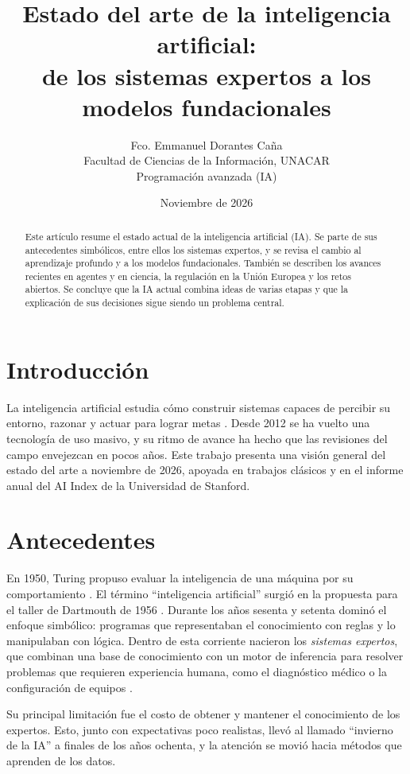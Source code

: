 \documentclass[11pt,a4paper]{article}
\title{Estado del arte de la inteligencia artificial:\\ de los sistemas expertos a los modelos fundacionales}
\author{Fco. Emmanuel Dorantes Caña\\
Facultad de Ciencias de la Información, UNACAR\\
Programación avanzada (IA)}
\date{Noviembre de 2026}
\begin{document}
\maketitle

\begin{abstract}
Este artículo resume el estado actual de la inteligencia artificial (IA). Se parte de sus antecedentes simbólicos, entre ellos los sistemas expertos, y se revisa el cambio al aprendizaje profundo y a los modelos fundacionales. También se describen los avances recientes en agentes y en ciencia, la regulación en la Unión Europea y los retos abiertos. Se concluye que la IA actual combina ideas de varias etapas y que la explicación de sus decisiones sigue siendo un problema central.
\end{abstract}

\section{Introducción}
La inteligencia artificial estudia cómo construir sistemas capaces de percibir su entorno, razonar y actuar para lograr metas \cite{russell2020}. Desde 2012 se ha vuelto una tecnología de uso masivo, y su ritmo de avance ha hecho que las revisiones del campo envejezcan en pocos años. Este trabajo presenta una visión general del estado del arte a noviembre de 2026, apoyada en trabajos clásicos y en el informe anual del AI Index de la Universidad de Stanford.

\section{Antecedentes}
En 1950, Turing propuso evaluar la inteligencia de una máquina por su comportamiento \cite{turing1950}. El término ``inteligencia artificial'' surgió en la propuesta para el taller de Dartmouth de 1956 \cite{mccarthy1955}. Durante los años sesenta y setenta dominó el enfoque simbólico: programas que representaban el conocimiento con reglas y lo manipulaban con lógica. Dentro de esta corriente nacieron los \emph{sistemas expertos}, que combinan una base de conocimiento con un motor de inferencia para resolver problemas que requieren experiencia humana, como el diagnóstico médico o la configuración de equipos \cite{russell2020}.

Su principal limitación fue el costo de obtener y mantener el conocimiento de los expertos. Esto, junto con expectativas poco realistas, llevó al llamado ``invierno de la IA'' a finales de los años ochenta, y la atención se movió hacia métodos que aprenden de los datos.
\end{document}
